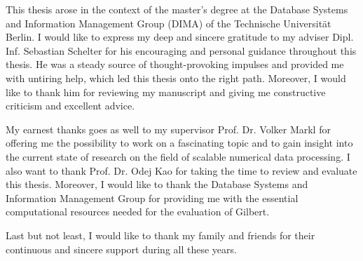 \clearemptydoublepage
{}
{}	


\vspace*{2cm}

\begin{center}
\end{center}

\vspace{1cm}

This thesis arose in the context of the master’s degree at the Database Systems and Information Management Group (DIMA) of the Technische Universität Berlin. 
I would like to express my deep and sincere gratitude to my adviser Dipl. Inf. Sebastian Schelter for his encouraging and personal guidance throughout this thesis. 
He was a steady source of thought-provoking impulses and provided me with untiring help, which led this thesis onto the right path. 
Moreover, I would like to thank him for reviewing my manuscript and giving me constructive criticism and excellent advice.

My earnest thanks goes as well to my supervisor Prof. Dr. Volker Markl for offering me the possibility to work on a fascinating topic and to gain insight into the current state of research on the field of scalable numerical data processing.
I also want to thank Prof. Dr. Odej Kao for taking the time to review and evaluate this thesis.
Moreover, I would like to thank the Database Systems and Information Management Group for providing me with the essential computational resources needed for the evaluation of Gilbert.

Last but not least, I would like to thank my family and friends for their continuous and sincere support during all these years.